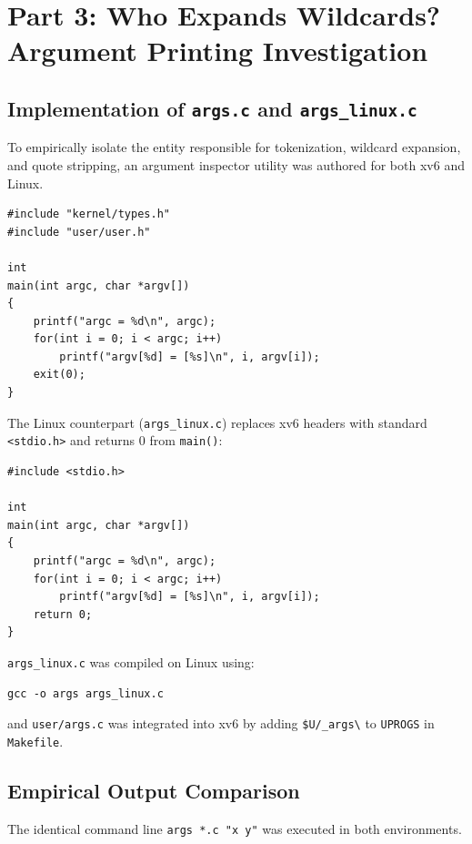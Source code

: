 \documentclass[12pt,a4paper]{article}
\begin{document}
\section{Part 3: Who Expands Wildcards? Argument Printing Investigation}

\subsection{Implementation of \texttt{args.c} and \texttt{args\_linux.c}}
To empirically isolate the entity responsible for tokenization, wildcard expansion, and quote stripping, an argument inspector utility was authored for both xv6 and Linux.

\begin{lstlisting}[style=cstyle, caption={Argument inspection program for xv6 (user/args.c)}]
#include "kernel/types.h"
#include "user/user.h"

int
main(int argc, char *argv[])
{
    printf("argc = %d\n", argc);
    for(int i = 0; i < argc; i++)
        printf("argv[%d] = [%s]\n", i, argv[i]);
    exit(0);
}
\end{lstlisting}

The Linux counterpart (\texttt{args\_linux.c}) replaces xv6 headers with standard \texttt{<stdio.h>} and returns 0 from \texttt{main()}:

\begin{lstlisting}[style=cstyle, caption={Argument inspection program for Linux (args\_linux.c)}]
#include <stdio.h>

int
main(int argc, char *argv[])
{
    printf("argc = %d\n", argc);
    for(int i = 0; i < argc; i++)
        printf("argv[%d] = [%s]\n", i, argv[i]);
    return 0;
}
\end{lstlisting}

\texttt{args\_linux.c} was compiled on Linux using:
\begin{lstlisting}[style=consolestyle]
gcc -o args args_linux.c
\end{lstlisting}
and \texttt{user/args.c} was integrated into xv6 by adding \texttt{\$U/\_args\textbackslash} to \texttt{UPROGS} in \texttt{Makefile}.

\subsection{Empirical Output Comparison}
The identical command line \texttt{args *.c "x y"} was executed in both environments.
\end{document}
